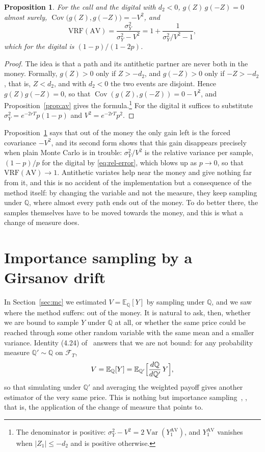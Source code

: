 \documentclass[11pt,a4paper]{article}
\theoremstyle{plain}
\newtheorem{proposition}[theorem]{Proposition}
\theoremstyle{definition}
\theoremstyle{remark}
\newcommand{\E}{\mathbb{E}}
\newcommand{\Q}{\mathbb{Q}}
\newcommand{\F}{\mathcal{F}}
\newcommand{\1}{\mathbf{1}}
\newcommand{\Var}{\operatorname{Var}}
\newcommand{\VRF}{\mathrm{VRF}}
\newcommand{\Cov}{\operatorname{Cov}}
\begin{document}
\begin{proposition}\label{prop:av-otm}
For the call and the digital with $d_2 < 0$, $g(Z)\,g(-Z) = 0$ almost surely, $\Cov\bigl(g(Z), g(-Z)\bigr) = -V^2$, and
\[
  \VRF(\mathrm{AV}) = \frac{\sigma_Y^2}{\sigma_Y^2 - V^2} = 1 + \frac{1}{\sigma_Y^2/V^2 - 1},
\]
which for the digital is $(1 - p)/(1 - 2p)$.
\end{proposition}

\begin{proof}
The idea is that a path and its antithetic partner are never both in the money. Formally, $g(Z) > 0$ only if $Z > -d_2$, and $g(-Z) > 0$ only if $-Z > -d_2$, that is, $Z < d_2$, and with $d_2 < 0$ the two events are disjoint. Hence $g(Z)g(-Z) = 0$, so that $\Cov(g(Z), g(-Z)) = 0 - V^2$, and Proposition~\ref{prop:av} gives the formula.\footnote{The denominator is positive: $\sigma_Y^2 - V^2 = 2\Var(Y_1^{\mathrm{AV}})$, and $Y_1^{\mathrm{AV}}$ vanishes when $|Z_1| \le -d_2$ and is positive otherwise.} For the digital it suffices to substitute $\sigma_Y^2 = e^{-2rT}p(1-p)$ and $V^2 = e^{-2rT}p^2$.
\end{proof}

Proposition~\ref{prop:av-otm} says that out of the money the only gain left is the forced covariance $-V^2$, and its second form shows that this gain disappears precisely when plain Monte Carlo is in trouble: $\sigma_Y^2/V^2$ is the relative variance per sample, $(1-p)/p$ for the digital by \eqref{eq:rel-error}, which blows up as $p \to 0$, so that $\VRF(\mathrm{AV}) \to 1$. Antithetic variates help near the money and give nothing far from it, and this is no accident of the implementation but a consequence of the method itself: by changing the variable and not the measure, they keep sampling under $\Q$, where almost every path ends out of the money. To do better there, the samples themselves have to be moved towards the money, and this is what a change of measure does.

\section{Importance sampling by a Girsanov drift}
\label{sec:is}

In Section~\ref{sec:mc} we estimated $V = \E_\Q[Y]$ by sampling under $\Q$, and we saw where the method suffers: out of the money. It is natural to ask, then, whether we are bound to sample $Y$ under $\Q$ at all, or whether the same price could be reached through some other random variable with the same mean and a smaller variance. Identity (4.24) of~\cite{tfg} answers that we are not bound: for any probability measure $\Q' \sim \Q$ on $\F_T$,
\begin{equation}\label{eq:is-idea}
  V = \E_\Q[Y] = \E_{\Q'}\Bigl[\frac{d\Q}{d\Q'}\, Y\Bigr],
\end{equation}
so that simulating under $\Q'$ and averaging the weighted payoff gives another estimator of the very same price. This is nothing but importance sampling~\cite[\S 4.6]{glasserman}, \cite[Ch.~V]{asmussen-glynn}, that is, the application of the change of measure that \cite[Remark~4.16]{tfg} points to.
\end{document}
